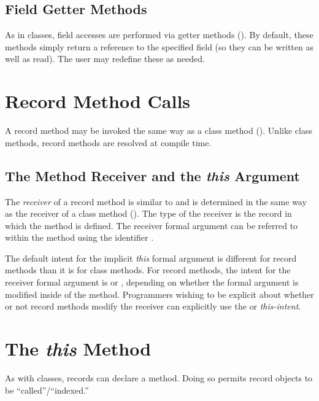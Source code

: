 \subsection{Field Getter Methods}
\label{Field_Getter_Methods}

As in classes, field accesses are performed via getter methods
().  By default, these methods simply return a reference to
the specified field (so they can be written as well as read).  The user may
redefine these as needed.

\section{Record Method Calls}
\label{Record_Method_Access}

A record method may be invoked the same way as a class method
().  Unlike class methods, record methods are
resolved at compile time.  

\subsection{The Method Receiver and the {\em this} Argument}
\label{The_this_Reference}

The \emph{receiver} of a record method is similar to and is determined in the
same way as the receiver of a class method ().
The type of the receiver is the record in which the method is defined.
The receiver formal argument can be referred to within the method
using the identifier .

The default intent for the implicit {\em this} formal argument is
different for record methods than it is for class methods. For record
methods, the intent for the receiver formal argument is  or
, depending on whether the formal argument is modified
inside of the method. Programmers wishing to be explicit about whether or
not record methods modify the receiver can explicitly use the 
or  {\em this-intent}.

\section{The {\em this} Method}

As with classes, records can declare a  method.  Doing so
permits record objects to be ``called''/``indexed.''

